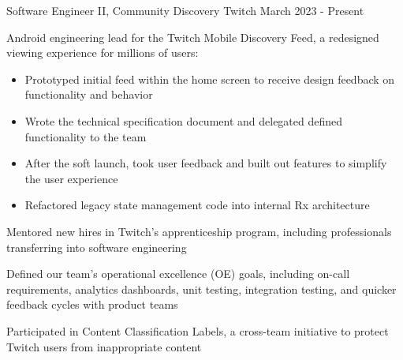 

\begin{cventries}


  \cventry
    {Software Engineer II, Community Discovery} %
    {Twitch} %
    {} %
    {March 2023 - Present} %
    {
    \begin{cvitems} %
    \item { Android engineering lead for the Twitch Mobile Discovery Feed, a redesigned viewing experience for millions of users: 
        \begin{itemize}
            \item Prototyped initial feed within the home screen to receive design feedback on functionality and behavior
            \item Wrote the technical specification document and delegated defined functionality to the team
            \item After the soft launch, took user feedback and built out features to simplify the user experience
            \item Refactored legacy state management code into internal Rx architecture
        \end{itemize}}
    \item Mentored new hires in Twitch's apprenticeship program, including professionals transferring into software engineering
    \item Defined our team's operational excellence (OE) goals, including on-call requirements, analytics dashboards, unit testing, integration testing, and quicker feedback cycles with product teams
    \item Participated in Content Classification Labels, a cross-team initiative to protect Twitch users from inappropriate content
    \end{cvitems}
    }


\end{cventries}
